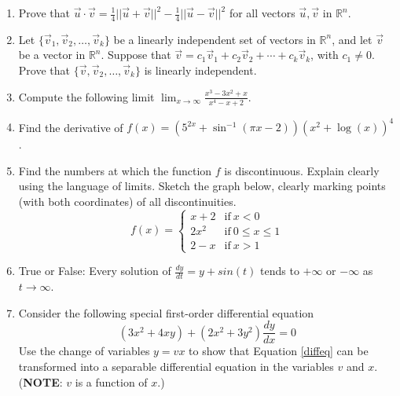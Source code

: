 \documentclass[11pt]{extarticle}
\begin{document}
{\begin{enumerate}
    \item Prove that $\vec{u} \cdot \vec v = \frac{1}{4}||\vec u + \vec v ||^2 - \frac{1}{4}||\vec u - \vec v||^2$ for all vectors $\vec u,\vec v$ in $\mathbb{R}^n$.
    \item Let $\{\vec{v}_1,\vec{v}_2,\dots,\vec{v}_k\}$ be a linearly independent set of vectors in $\mathbb{R}^n$, and let $\vec{v}$ be a vector in $\mathbb{R}^n$. Suppose that $\vec{v} = c_1\vec{v}_1 + c_2\vec{v}_2 + \cdots + c_k\vec{v}_k$, with $c_1\neq 0$. Prove that $\{\vec{v},\vec{v}_2,\dots,\vec{v}_k\}$ is linearly independent.
    \item Compute the following limit $\displaystyle\lim_{x\rightarrow \infty}\frac{x^3-3x^2+x}{x^4-x+2}$.
    \item Find the derivative of $f(x) = (5^{2x} + \sin^{-1}(\pi x - 2))(x^2 + \log(x))^4$.
    \item Find the numbers at which the function $f$ is discontinuous. Explain clearly using the language of limits. Sketch the graph below, clearly marking points (with both coordinates) of all discontinuities.
      \[
        f(x) = \begin{cases}
          x + 2 & \text{if} ~ x < 0\\
          2x^2 & \text{if} ~ 0\leq x \leq 1\\
          2-x & \text{if} ~ x>1
        \end{cases}
      \] 
    \item True or False: Every solution of $\frac{dy}{dt} = y + sin(t)$ tends to $+\infty$ or $-\infty$ as $t\rightarrow \infty$.
    \item Consider the following special first-order differential equation
      \begin{equation}\label{diffeq}
        (3x^2 + 4xy) + (2x^2 + 3y^2)\frac{dy}{dx} = 0
      \end{equation}
      Use the change of variables $y=vx$ to show that Equation \eqref{diffeq} can be transformed into a separable differential equation in the variables $v$ and $x$. (\textbf{NOTE}: $v$ is a function of $x$.)
  \end{enumerate}
}
\end{document}
